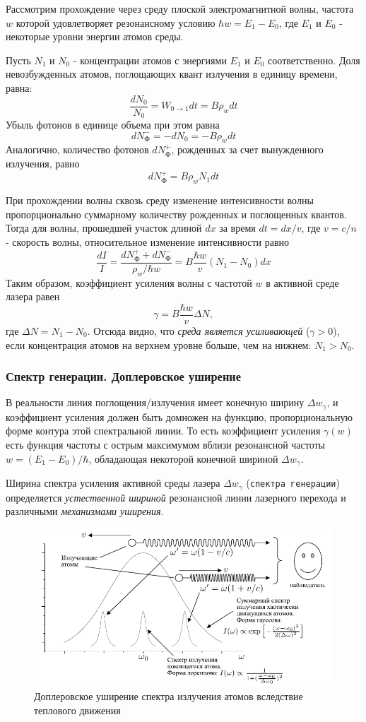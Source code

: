 \documentclass[a4paper,12pt]{article}
\begin{document}
Рассмотрим прохождение через среду плоской электромагнитной волны, частота $w$ которой удовлетворяет резонансному условию $\hbar w=E_1-E_0$, где $E_1$ и $E_0$ - некоторые уровни энергии атомов среды.

Пусть $N_1$ и $N_0$ - концентрации атомов с энергиями $E_1$ и $E_0$ соответственно. Доля невозбужденных атомов, поглощающих квант излучения в единицу времени, равна:
$$
\frac{dN_0}{N_0}=W_{0\rightarrow1}dt=B\rho_w dt
$$
Убыль фотонов в единице объема при этом равна
$$
dN_\text{Ф}^- = -dN_0 = -B\rho_w dt
$$
Аналогично, количество фотонов $dN_\text{Ф}^+$, рожденных за счет вынужденного излучения, равно
$$
dN_\text{Ф}^+=B\rho_w N_1 dt
$$

При прохождении волны сквозь среду изменение интенсивности волны пропорционально суммарному количеству рожденных и поглощенных квантов. Тогда для волны, прошедшей участок длиной $dx$ за время $dt=dx/v$, где $v=c/n$ - скорость волны, относительное изменение интенсивности равно
$$
\frac{dI}{I} = \frac{dN_\text{Ф}^+ + dN_\text{Ф}^-}{\rho_w/\hbar w} = B\frac{\hbar w}{v}(N_1-N_0)dx
$$
Таким образом, коэффициент усиления волны с частотой $w$ в активной среде лазера равен 
\begin{equation}
    \gamma = B\frac{\hbar w}{v}\Delta N ,
\end{equation}
где $\Delta N=N_1-N_0$. Отсюда видно, что \textit{среда является усиливающей} ($\gamma>0$), если концентрация атомов на верхнем уровне больше, чем на нижнем: $N_1>N_0$.

\subsubsection{Спектр генерации. Доплеровское уширение}

В реальности линия поглощения/излучения имеет конечную ширину $\Delta w_\gamma$, и коэффициент усиления должен быть домножен на функцию, пропорциональную форме контура этой спектральной линии. То есть коэффициент усиления $\gamma(w)$ есть функция частоты с острым максимумом вблизи резонансной частоты $w=(E_1-E_0)/\hbar$, обладающая некоторой конечной шириной $\Delta w_\gamma$.

Ширина спектра усиления активной среды лазера $\Delta w_\gamma$ (\texttt{спектра генерации}) определяется \textit{устественной шириной} резонансной линии лазерного перехода и различными \textit{механизмами уширения}.

\begin{figure}[h]
\centering
\includegraphics[width=0.5\linewidth]{img6.png}
\caption{Доплеровское уширение спектра излучения атомов вследствие теплового движения}
\label{img6}
\end{figure}
\end{document}
